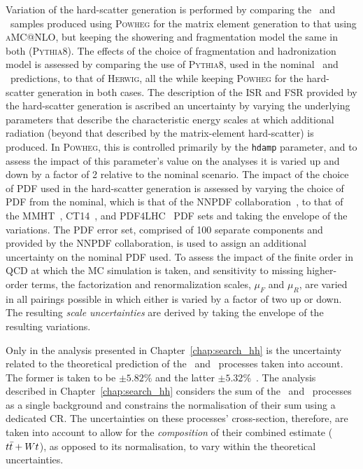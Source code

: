 Variation of the hard-scatter generation is performed by comparing the \ttbar~and \wt~samples produced
using \textsc{Powheg} for the matrix element generation to that using \textsc{aMC@NLO}, but keeping
the showering and fragmentation model the same in both (\textsc{Pythia8}).
The effects of the choice of fragmentation and hadronization model is assessed by comparing
the use of \textsc{Pythia8}, used in the nominal \ttbar~and \wt~predictions, to that of \textsc{Herwig}, all the while
keeping \textsc{Powheg} for the hard-scatter generation in both cases.
The description of the ISR and FSR provided by the hard-scatter generation is ascribed an
uncertainty by varying the underlying parameters that describe the characteristic energy
scales at which additional radiation (beyond that described by the matrix-element hard-scatter)
is produced.
In \textsc{Powheg}, this is controlled primarily by the \texttt{hdamp} parameter, and to assess
the impact of this parameter's value on the analyses it is varied up and down by a factor of 2 relative
to the nominal scenario.
The impact of the choice of PDF used in the hard-scatter generation is assessed by varying the
choice of PDF from the nominal, which is that of the NNPDF collaboration~\cite{Ball:2014uwa},
to that of the MMHT~\cite{Harland-Lang:2014zoa}, CT14~\cite{Lai:2010vv}, and PDF4LHC~\cite{Butterworth:2015oua} PDF sets and taking
the envelope of the variations.
The PDF error set, comprised of 100 separate components and provided by the NNPDF collaboration, is used to assign an additional uncertainty
on the nominal PDF used.
To assess the impact of the finite order in QCD at which the MC simulation is taken, and
sensitivity to missing higher-order terms, the factorization and renormalization scales,
$\mu_F$ and $\mu_R$, are varied in all pairings possible in which either is varied by a factor of two
up or down.
The resulting \textit{scale uncertainties} are derived by taking the envelope of the resulting variations.

Only in the analysis presented in Chapter~\ref{chap:search_hh} is the uncertainty related
to the theoretical prediction of the \ttbar~and \wt~processes taken into account.
The former is taken to be $\pm 5.82\%$ and the latter $\pm 5.32$\%~\cite{Czakon:2013goa,ATLAS-CONF-2013-102,Kidonakis:2010ux}.
The analysis described in Chapter~\ref{chap:search_hh} considers the sum of the \ttbar~and \wt~processes
as a single background and constrains the normalisation of their sum using a dedicated CR.
The uncertainties on these processes' cross-section, therefore, are taken into account to allow
for the \textit{composition} of their combined estimate ($t\bar{t}+Wt$), as opposed to its normalisation, to vary within the theoretical uncertainties.

